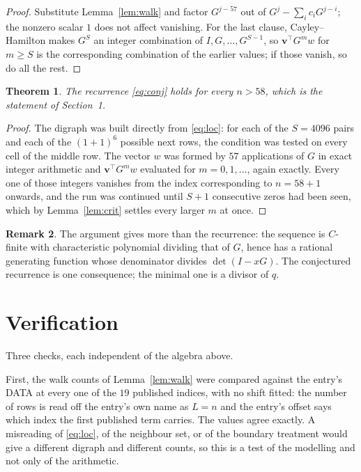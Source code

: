 \documentclass[11pt,a4paper]{article}
\theoremstyle{plain}
\newtheorem{theorem}{Theorem}
\theoremstyle{definition}
\newtheorem{remark}[theorem]{Remark}
\begin{document}
\begin{proof}
Substitute Lemma~\ref{lem:walk} and factor $G^{j-57}$ out of
$G^{j}-\sum_ic_iG^{j-i}$; the nonzero scalar $1$ does not affect
vanishing. For the last clause, Cayley--Hamilton makes $G^{S}$ an integer combination of
$I,G,\dots,G^{S-1}$, so $\mathbf{v}^{\!\top}G^{m}w$ for $m\ge S$ is the corresponding
combination of the earlier values; if those vanish, so do all the rest.
\end{proof}

\begin{theorem}
The recurrence \eqref{eq:conj} holds for every $n>58$, which is the statement of
Section~1.
\end{theorem}

\begin{proof}
The digraph was built directly from \eqref{eq:loc}: for each of the $S=4096$ pairs and each
of the $(1+1)^{6}$ possible next rows, the condition was tested on every cell of
the middle row. The vector $w$ was formed by $57$ applications of $G$ in exact integer
arithmetic and $\mathbf{v}^{\!\top}G^{m}w$ evaluated for $m=0,1,\dots$, again exactly.
Every one of those integers vanishes from the index corresponding to $n=58+1$ onwards,
and the run was continued until $S+1$ consecutive zeros had been seen, which by
Lemma~\ref{lem:crit} settles every larger $m$ at once.
\end{proof}

\begin{remark}
The argument gives more than the recurrence: the sequence is $C$-finite with characteristic
polynomial dividing that of $G$, hence has a rational generating function whose denominator
divides $\det(I-xG)$. The conjectured recurrence is one consequence; the minimal one is a
divisor of $q$.
\end{remark}

\section{Verification}

Three checks, each independent of the algebra above.

First, the walk counts of Lemma~\ref{lem:walk} were compared against the entry's DATA at
every one of the $19$ published indices, with no shift fitted: the number of rows is
read off the entry's own name as $L=n$ and the entry's offset says which index the first
published term carries. The values agree exactly. A misreading of \eqref{eq:loc}, of the
neighbour set, or of the boundary treatment would give a different digraph and different
counts, so this is a test of the modelling and not only of the arithmetic.
\end{document}
